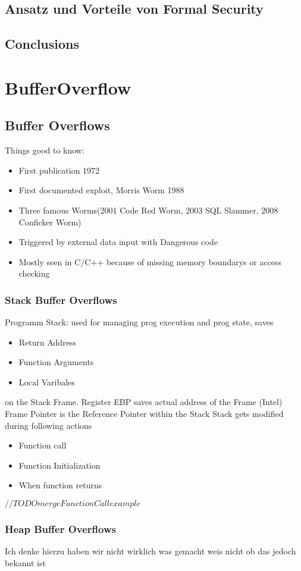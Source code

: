 \documentclass[a4paper, 12pt]{article}
\begin{document}
\subsection{Ansatz und Vorteile von Formal Security}
\subsection{Conclusions}

\section{BufferOverflow}
\subsection{Buffer Overflows}
Things good to know:
\begin{itemize}
\item First publication 1972
\item First documented exploit, Morris Worm 1988
\item Three famous Worms(2001 Code Red Worm, 2003 SQL Slammer, 2008 Conficker Worm)
\item Triggered by external data input with Dangerous code
\item Mostly seen in C/C++ because of missing memory boundarys or access checking
\end{itemize}
\subsubsection{Stack Buffer Overflows}
Programm Stack: used for managing prog execution and prog state, saves 
\begin{itemize}
\item Return Address
\item Function Arguments
\item Local Varibales
\end{itemize}
on the Stack Frame.
Register EBP saves actual address of the Frame (Intel)
Frame Pointer is the Reference Pointer within the Stack
Stack gets modified during following actions
\begin{itemize}
\item Function call
\item Function Initialization
\item When function returns
\end{itemize}
$ //TODO merge FunctionCall example $
\subsubsection{Heap Buffer Overflows}
Ich denke hierzu haben wir nicht wirklich was gemacht weis nicht ob das jedoch bekannt ist
\end{document}
